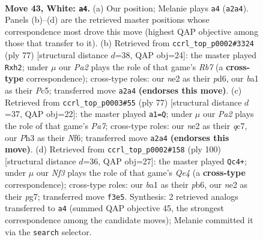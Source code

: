 \documentclass[11pt]{article}
\begin{document}
\clearpage

\begin{figure}[p]\centering
\begin{subfigure}{0.46\textwidth}\centering
\resizebox{\linewidth}{!}{%
\newchessgame
\chessboard[
  setfen={6k1/1p3p2/6p1/p7/7p/5N1P/P3n1PK/b4q2 w - - 4 43},
  showmover=false,
  pgfstyle=straightmove, color=movearrow, markmove={a2-a4}
]}
\caption{}
\end{subfigure}\hfill
\begin{subfigure}{0.46\textwidth}\centering
\resizebox{\linewidth}{!}{%
\newchessgame
\chessboard[
  setfen={6k1/3Q1p2/3Pn1p1/2p4p/8/6P1/1r5P/5K2 b - - 0 39},
  showmover=false,
  pgfstyle=straightmove, color=movearrow, markmove={b2-h2}
]}
\caption{}
\end{subfigure}
\\[4pt]
\begin{subfigure}{0.46\textwidth}\centering
\resizebox{\linewidth}{!}{%
\newchessgame
\chessboard[
  setfen={6k1/2Q2pp1/qP3n1p/4N3/8/6PP/p4P1K/8 b - - 1 39},
  showmover=false,
  pgfstyle=straightmove, color=movearrow, markmove={a2-a1}
]}
\caption{}
\end{subfigure}\hfill
\begin{subfigure}{0.46\textwidth}\centering
\resizebox{\linewidth}{!}{%
\newchessgame
\chessboard[
  setfen={6k1/p5p1/1p1N3p/8/4Q1KP/P7/1P4pq/8 w - - 4 51},
  showmover=false,
  pgfstyle=straightmove, color=movearrow, markmove={e4-c4}
]}
\caption{}
\end{subfigure}
\caption{\textbf{Move 43, White: \texttt{a4}.} (a) Our position; Melanie plays \texttt{a4} (\texttt{a2a4}). Panels (b)--(d) are the retrieved master positions whose correspondence most drove this move (highest QAP objective among those that transfer to it). (b) Retrieved from \texttt{ccrl\_top\_p0002\#3324} (ply 77) [structural distance $d$=38, QAP obj=24]: the master played \texttt{Rxh2}; under $\mu$ our \emph{Pa2} plays the role of that game's \emph{Rb7} (a \textbf{cross-type} correspondence); cross-type roles: our \emph{n}e2 as their \emph{p}d6, our \emph{b}a1 as their \emph{P}c5; transferred move \texttt{a2a4} \textbf{(endorses this move)}. (c) Retrieved from \texttt{ccrl\_top\_p0003\#55} (ply 77) [structural distance $d$=37, QAP obj=22]: the master played \texttt{a1=Q}; under $\mu$ our \emph{Pa2} plays the role of that game's \emph{Pa7}; cross-type roles: our \emph{n}e2 as their \emph{q}c7, our \emph{P}h3 as their \emph{N}f6; transferred move \texttt{a2a4} \textbf{(endorses this move)}. (d) Retrieved from \texttt{ccrl\_top\_p0002\#158} (ply 100) [structural distance $d$=36, QAP obj=27]: the master played \texttt{Qc4+}; under $\mu$ our \emph{Nf3} plays the role of that game's \emph{Qe4} (a \textbf{cross-type} correspondence); cross-type roles: our \emph{b}a1 as their \emph{p}b6, our \emph{n}e2 as their \emph{p}g7; transferred move \texttt{f3e5}. Synthesis: 2 retrieved analogs transferred to \texttt{a4} (summed QAP objective 45, the strongest correspondence among the candidate moves); Melanie committed it via the \texttt{search} selector.}
\label{fig:thought-m84}
\end{figure}
\end{document}
